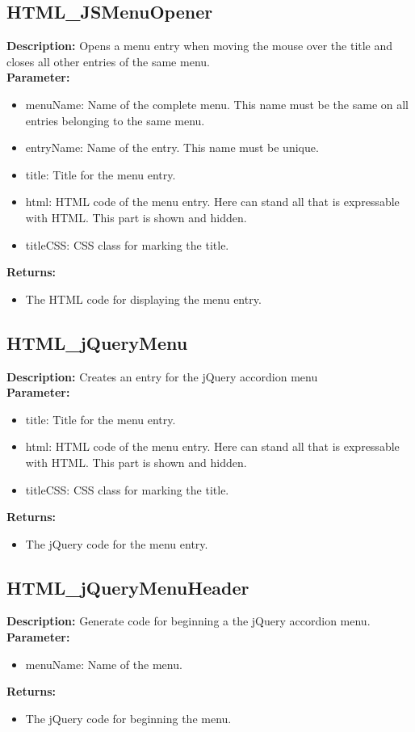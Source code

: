 \subsection{HTML\_JSMenuOpener}
\textbf{Description:} Opens a menu entry when moving the mouse over the title and closes all other entries of the same menu.\\
\textbf{Parameter:}
\begin{itemize}
\item menuName: Name of the complete menu. This name must be the same on all entries belonging to the same menu.
\item entryName: Name of the entry. This name must be unique.
\item title: Title for the menu entry.
\item html: HTML code of the menu entry. Here can stand all that is expressable with HTML. This part is shown and hidden.
\item titleCSS: CSS class for marking the title.
\end{itemize}
\textbf{Returns:}
\begin{itemize}
\item The HTML code for displaying the menu entry.
\end{itemize}

\subsection{HTML\_jQueryMenu}
\textbf{Description:} Creates an entry for the jQuery accordion menu\\
\textbf{Parameter:}
\begin{itemize}
\item title: Title for the menu entry.
\item html: HTML code of the menu entry. Here can stand all that is expressable with HTML. This part is shown and hidden.
\item titleCSS: CSS class for marking the title.
\end{itemize}
\textbf{Returns:}
\begin{itemize}
\item The jQuery code for the menu entry.
\end{itemize}

\subsection{HTML\_jQueryMenuHeader}
\textbf{Description:} Generate code for beginning a the jQuery accordion menu.\\
\textbf{Parameter:}
\begin{itemize}
\item menuName: Name of the menu.
\end{itemize}
\textbf{Returns:}
\begin{itemize}
\item The jQuery code for beginning the menu.
\end{itemize}

